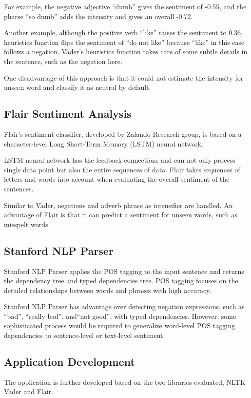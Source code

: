 \documentclass[sigconf]{acmart}
\begin{document}
For example, the negative adjective “dumb” gives the sentiment of -0.55, and the pharse “so dumb” adds the intensity and gives an overall -0.72. 

Another example, although the positive verb “like” raises the sentiment to 0.36, heuristics function flips the sentiment of “do not like” because “like” in this case follows a negation. Vader’s heuristics function takes care of some subtle details in the sentence, such as the negation here.

One disadvantage of this approach is that it could not estimate the intensity for unseen word and classify it as neutral by default.

\subsection{Flair Sentiment Analysis}

Flair’s sentiment classifier, developed by Zalando Research group\cite{Flair}, is based on a character-level Long Short-Term Memory (LSTM)\cite{LSTM} neural network.

LSTM neural network has the feedback connections and can not only process single data point but also the entire sequences of data. Flair takes sequences of letters and words into account when evaluating the overall sentiment of the sentences.

Similar to Vader, negations and adverb phrase as intensifier are handled. An advantage of Flair is that it can predict a sentiment for unseen words, such as misspelt words.

\subsection{Stanford NLP Parser}

Stanford NLP Parser applies the POS tagging to the input sentence and returns the dependency tree and typed dependencies tree. POS tagging focuses on the detailed relationships between words and phrases with high accuracy.

Stanford NLP Parser has advantage over detecting negation expressions, such as “bad”, “really bad”, and“not good”, with typed dependencies. However, some sophisticated process would be required to generalize word-level POS tagging dependencies to sentence-level or text-level sentiment. 

\subsection{Application Development}
The application is further developed  based on the two libraries evaluated, NLTK Vader and Flair. 
\end{document}
